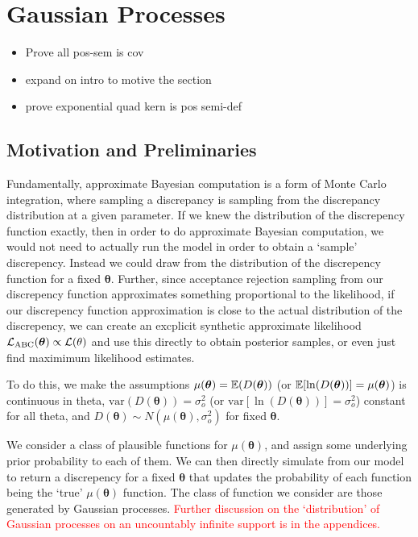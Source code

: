 \chapter{Gaussian Processes}

\begin{itemize}
    \item Prove all pos-sem is cov
    \item expand on intro to motive the section
    \item prove exponential quad kern is pos semi-def
\end{itemize}

\section{Motivation and Preliminaries}

Fundamentally, approximate Bayesian computation is a form of Monte Carlo
integration, where sampling a discrepancy is sampling from the discrepancy
distribution at a given parameter. If we knew the distribution of the
discrepency function exactly, then in order to do approximate
Bayesian computation, we would not need to actually run the model in order to
obtain a `sample' discrepency. Instead we could draw from the distribution of the
discrepency function for a fixed $\bm\theta.$ Further, since acceptance
rejection sampling from our discrepency function approximates something
proportional to the likelihood, if our discrepency function approximation is
close to the actual distribution of the discrepency, we can create an excplicit
synthetic approximate likelihood $\mathcal{L}_\text{ABC}(\bm\theta)\propto \mathcal{L}(\theta)$
and use this directly to obtain posterior samples, or even just find maximimum
likelihood estimates.

To do this, we make the assumptions $\mu(\bm\theta) = \operatorname{\mathbb{E}}(D(\bm\theta))$
(or $\operatorname{\mathbb{E}}[\ln(D(\bm\theta))] = \mu(\bm\theta)$) is
continuous in theta, $\mathrm{var}(D(\bm\theta)) = \sigma^2_o$
(or $\mathrm{var}[\ln(D(\bm\theta))] = \sigma^2_o$) constant for all theta,
and $D(\bm\theta) \sim N(\mu(\bm\theta), \sigma^2_o)$ for fixed $\bm\theta.$

We consider a class of plausible functions for $\mu(\bm\theta)$, and assign
some underlying prior
probability to each of them. We can then directly simulate from our model to
return a discrepency for a fixed $\bm\theta$ that updates the probability of
each function being the `true' $\mu(\bm\theta)$
function. The class of function we consider are those generated by Gaussian
processes. \textcolor{red}{
    Further discussion on the `distribution' of Gaussian processes on an
    uncountably infinite support is in the appendices.
}

